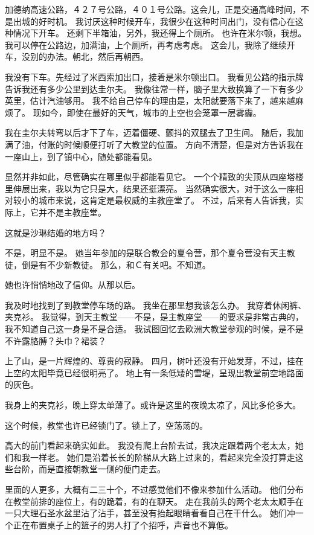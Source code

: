 \documentclass[UTF8]{ctexart}
\begin{document}
加德纳高速公路，４２７号公路，４０１号公路。这会儿，正是交通高峰时间，不是出城的好时机。
我讨厌这种时候开车，我很少在这种时间出门，没有信心在这种情况下开车。
还剩下半箱油，另外，我还得上个厕所。
也许在米尔顿，我想。我可以停在公路边，加满油，上个厕所，再考虑考虑。
这会儿，我除了继续开车，没别的办法。朝北，然后再朝西。

我没有下车。先经过了米西索加出口，接着是米尔顿出口。
我看见公路的指示牌告诉我还有多少公里到达圭尔夫。
我像往常一样，脑子里大致换算了一下有多少英里，估计汽油够用。
我不给自己停车的理由是，太阳就要落下来了，越来越麻烦了。
现如今，即使在最好的天气，城市的上空也会笼罩一层雾霾。


我在圭尔夫转弯以后才下了车，迈着僵硬、颤抖的双腿去了卫生间。
随后，我加满了油，付账的时候顺便打听了大教堂的位置。
方向不清楚，但是对方告诉我在一座山上，到了镇中心，随处都能看见。

显然并非如此，尽管确实在哪里似乎都能看见它。
一个个精致的尖顶从四座塔楼里伸展出来，我以为它只是大，结果还挺漂亮。
当然确实很大，对于这么一座相对较小的城市来说，这肯定是最权威的主教座堂了。
不过，后来有人告诉我，实际上，它并不是主教座堂。

这就是沙琳结婚的地方吗？

不是，明显不是。
她当年参加的是联合教会的夏令营，那个夏令营没有天主教徒，倒是有不少新教徒。
那么，和Ｃ有关吧。不知道。

她也许悄悄地改了信仰。从那以后。

我及时地找到了到教堂停车场的路。
我坐在那里想我该怎么办。
我穿着休闲裤、夹克衫。
我觉得，到天主教堂——不是，是主教座堂——的要求是非常古典的，我不知道自己这一身是不是合适。
我试图回忆去欧洲大教堂参观的时候，是不是不许露胳膊？头巾？裙装？

上了山，是一片辉煌的、尊贵的寂静。
四月，树叶还没有开始发芽，不过，挂在上空的太阳毕竟已经很明亮了。
地上有一条低矮的雪堤，呈现出教堂前空地路面的灰色。

我身上的夹克衫，晚上穿太单薄了。或许是这里的夜晚太凉了，风比多伦多大。

这个时候，教堂也许已经锁门了。锁上了，空荡荡的。

高大的前门看起来确实如此。
我没有爬上台阶去试，我决定跟着两个老太太，她们和我一样老。
她们是沿着长长的阶梯从大路上过来的，看起来完全没打算走这些台阶，而是直接朝教堂一侧的便门走去。

里面的人更多，大概有二三十个，不过感觉他们不像来参加什么活动。
他们分布在教堂前排的座位上，有的跪着，有的在聊天。
走在我前头的两个老太太顺手在一只大理石圣水盆里沾了沾手，甚至没有抬起眼睛看看自己在干什么。
她们冲一个正在布置桌子上的篮子的男人打了个招呼，声音也不算低。
\end{document}

